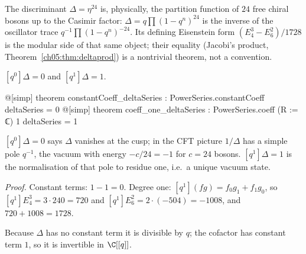 \begin{physics}
The discriminant $\Delta=\eta^{24}$ is, physically, the partition function of $24$ free chiral bosons up to the Casimir factor: $\Delta=q\prod(1-q^n)^{24}$ is the inverse of the oscillator trace $q^{-1}\prod(1-q^n)^{-24}$. Its defining Eisenstein form $(E_4^3-E_6^2)/1728$ is the modular side of that same object; their equality (Jacobi's product, Theorem~\ref{ch05:thm:deltaprod}) is a nontrivial theorem, not a convention.
\end{physics}

\begin{proposition}\label{ch05:prop:deltaorder}
$[q^0]\Delta = 0$ and $[q^1]\Delta = 1$.
\end{proposition}
\begin{leancode}
@[simp] theorem constantCoeff_deltaSeries : PowerSeries.constantCoeff deltaSeries = 0
@[simp] theorem coeff_one_deltaSeries : PowerSeries.coeff (R := ℂ) 1 deltaSeries = 1
\end{leancode}

\begin{physics}
$[q^0]\Delta=0$ says $\Delta$ vanishes at the cusp; in the CFT picture $1/\Delta$ has a simple pole $q^{-1}$, the vacuum with energy $-c/24=-1$ for $c=24$ bosons. $[q^1]\Delta=1$ is the normalisation of that pole to residue one, i.e.\ a unique vacuum state.
\end{physics}
\noindent\emph{Proof.} Constant terms: $1 - 1 = 0$. Degree one: $[q^1](fg) = f_0g_1 + f_1g_0$, so
$[q^1]E_4^3 = 3\cdot240 = 720$ and $[q^1]E_6^2 = 2\cdot(-504) = -1008$, and $720 + 1008 = 1728$.

Because $\Delta$ has no constant term it is divisible by $q$; the cofactor has constant term $1$, so it
is invertible in $\C[[q]]$.

